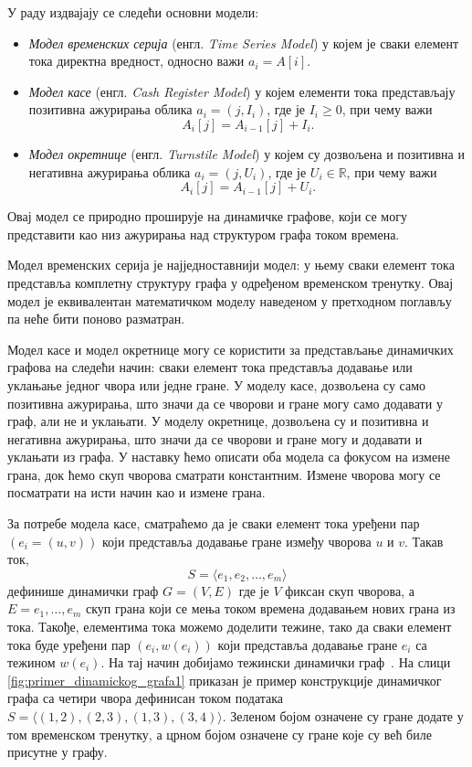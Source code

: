 У раду \cite{muthukrishnan2005data} издвајају се следећи основни модели:

\begin{itemize}
    \item \textit{Модел временских серија} (енгл. \textit{Time Series Model}) у којем
    је сваки елемент тока директна вредност, односно важи $a_i = A[i]$.

    \item \textit{Модел касе} (енгл. \textit{Cash Register Model}) у којем
    елементи тока представљају позитивна ажурирања облика $a_i = (j, I_i)$,
    где је $I_i \ge 0$, при чему важи
    \[
    A_i[j] = A_{i-1}[j] + I_i.
    \]

    \item \textit{Модел окретнице} (енгл. \textit{Turnstile Model}) у којем
    су дозвољена и позитивна и негативна ажурирања облика $a_i = (j, U_i)$,
    где је $U_i \in \mathbb{R}$, при чему важи
    \[
    A_i[j] = A_{i-1}[j] + U_i.
    \]
\end{itemize}

Овај модел се природно проширује на динамичке графове, који се могу
представити као низ ажурирања над структуром графа током времена.

Модел временских серија је најједноставнији модел: у њему сваки елемент тока представља комплетну структуру графа у одређеном временском тренутку. Овај модел је еквивалентан математичком моделу наведеном у претходном поглављу па неће бити поново разматран.

Модел касе и модел окретнице могу се користити за представљање динамичких графова на следећи начин: сваки елемент тока представља додавање или уклањање једног чвора или једне гране. У моделу касе, дозвољена су само позитивна ажурирања, што значи да се чворови и гране могу само додавати у граф, али не и уклањати. У моделу окретнице, дозвољена су и позитивна и негативна ажурирања, што значи да се чворови и гране могу и додавати и уклањати из графа. У наставку ћемо описати оба модела са фокусом на измене грана, док ћемо скуп чворова сматрати константним. Измене чворова могу се посматрати на исти начин као и измене грана. 

За потребе модела касе, сматраћемо да је сваки елемент тока уређени пар $(e_i=(u, v))$ који представља додавање гране између чворова $u$ и $v$. Такав ток, 
\[S = \langle e_1, e_2, \ldots, e_m \rangle\]
дефинише динамички граф $G = (V, E)$ где је $V$ фиксан скуп чворова, а $E={e_1, \dots , e_m}$ скуп грана који се мења током времена додавањем нових грана из тока.  Такође, елементима тока можемо доделити тежине, тако да сваки елемент тока буде уређени пар $(e_i, w(e_i))$ који представља додавање гране $e_i$ са тежином $w(e_i)$. На тај начин добијамо тежински динамички граф~\cite{graph_stream_algorithms_survey}. На слици \ref{fig:primer_dinamickog_grafa1} приказан је пример конструкције динамичког графа са четири чвора дефинисан током података $S = \langle (1, 2), (2, 3), (1, 3), (3, 4)\rangle$. Зеленом бојом означене су гране додате у том временском тренутку, а црном бојом означене су гране које су већ биле присутне у графу. 

